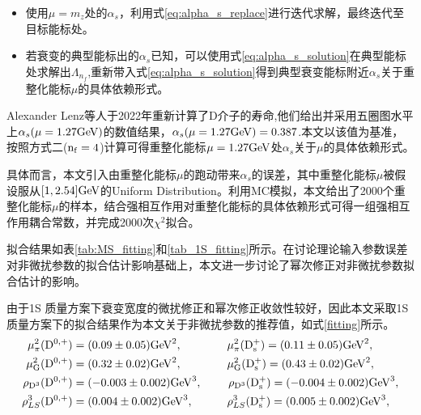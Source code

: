 \begin{itemize}
\item 使用$\mu=m_{z}$处的$\alpha_s$，利用式\eqref{eq:alpha_s_replace}进行迭代求解，最终迭代至目标能标处。
\item 若衰变的典型能标出的$\alpha_s$已知，可以使用式\eqref{eq:alpha_s_solution}在典型能标处求解出$\Lambda_{n_{f}}$,重新带入式\eqref{eq:alpha_s_solution}得到典型衰变能标附近$\alpha_s$关于重整化能标$\mu$的具体依赖形式。
\end{itemize}
Alexander Lenz等人于2022年重新计算了D介子的寿命,他们给出并采用五圈图水平上$\alpha_s(\mu=1.27\mathrm{GeV})$的数值结果，$\alpha_s(\mu=1.27\mathrm{GeV})=0.387$.本文以该值为基准，按照方式二($\mathrm{n_{f}=4}$)计算可得重整化能标$\mu=1.27\mathrm{GeV}$处$\alpha_s$关于$\mu$的具体依赖形式。

具体而言，本文引入由重整化能标$\mu$的跑动带来$\alpha_s$的误差，其中重整化能标$\mu$被假设服从$[1, 2.54]\mathrm{GeV}$的Uniform Distribution。利用MC模拟，本文给出了2000个重整化能标$\mu$的样本，结合强相互作用对重整化能标的具体依赖形式可得一组强相互作用耦合常数，并完成2000次$\chi^{2}$拟合。

拟合结果如表\ref{tab:MS_fitting}和\ref{tab_1S_fitting}所示。在讨论理论输入参数误差对非微扰参数的拟合估计影响基础上，本文进一步讨论了幂次修正对非微扰参数拟合估计的影响。

由于1S 质量方案下衰变宽度的微扰修正和幂次修正收敛性较好，因此本文采取1S质量方案下的拟合结果作为本文关于非微扰参数的推荐值，如式\eqref{fitting}所示。
\begin{equation}
\begin{aligned}
    \mu^2_\pi(\mrm{D^{0,+}}) &= (0.09\pm 0.05) \mathrm{GeV}^2, \qquad \qquad
    \mu^2_\pi(\mrm{D^{+}_s}) = (0.11\pm 0.05) \mathrm{GeV}^2,  \\
    \mu^2_\mrm{G}(\mrm{D^{0,+}}) &= (0.32\pm 0.02) \mathrm{GeV}^2, \qquad \qquad 
    \mu^2_\mrm{G}(\mrm{D^{+}_s}) = (0.43\pm 0.02) \mathrm{GeV}^2, \nonumber \\
    \rho_\mrm{D^3}(\mrm{D^{0,+}}) &= (-0.003\pm 0.002) \mathrm{GeV}^3, \qquad\ 
    \rho_\mrm{D^3}(\mrm{D^{+}_s}) = (-0.004\pm 0.002) \mathrm{GeV}^3, \nonumber \\
    \rho_{LS}^3(\mrm{D^{0,+}}) &= (0.004\pm 0.002) \mathrm{GeV}^3, \qquad \ \ \ 
    \rho_{LS}^3(\mrm{D^{+}_s}) = (0.005\pm 0.002) \mathrm{GeV}^3 , \nonumber 
    \end{aligned}
    \label{fitting}
\end{equation}

